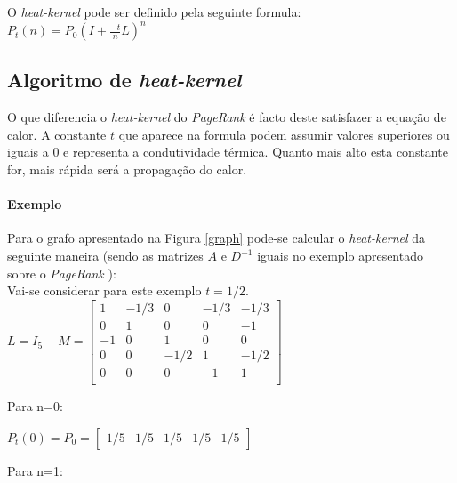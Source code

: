     O \textit{heat-kernel} pode ser definido pela seguinte formula:\\
    $P_t(n)=P_0(I+\frac{-t}{n}L)^n$
	
  \subsection{Algoritmo de \textit{heat-kernel}}
  O que diferencia o \textit{heat-kernel} do \textit{PageRank} é  facto deste satisfazer a equação de calor. A constante $t$ que aparece na formula podem assumir valores superiores ou iguais a 0 e representa a condutividade térmica. Quanto mais alto esta constante for, mais rápida será a propagação do calor.  
    
  \paragraph{Exemplo}   
  Para o grafo apresentado na Figura \ref{graph} pode-se calcular o \textit{heat-kernel} da seguinte maneira (sendo as matrizes $A$ e $D^{{-}1}$ iguais no exemplo apresentado sobre o \textit{PageRank} ): \\[0.25cm]
  Vai-se considerar para este exemplo $t=1/2$. \\[0.25cm]
  $L = I_5 - M = \begin{bmatrix} 
		    1 & -1/3 & 0 & -1/3 & -1/3 \\
		    0 & 1 & 0 & 0 & -1 \\
		    -1 & 0 & 1 & 0 & 0\\
		    0 & 0 & -1/2 & 1 & -1/2\\
		    0 & 0 & 0 & -1 & 1\\
		 \end{bmatrix}$
  \\[0.25cm]
  \begin{bf}
    Para n=0:
  \end{bf}
  
  $P_t(0) = P_0 = \begin{bmatrix} 1/5 & 1/5 & 1/5 & 1/5 & 1/5 \end{bmatrix}$
  \\[0.25cm]
  \begin{bf}
    Para n=1:
  \end{bf}
  
